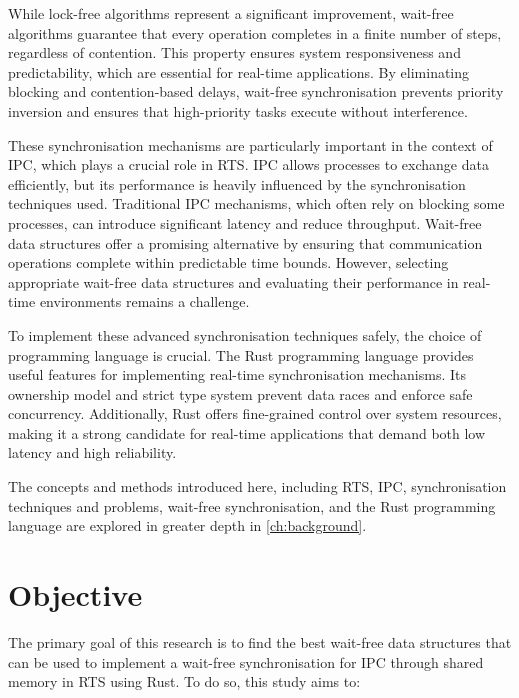 While lock-free algorithms represent a significant improvement, wait-free algorithms guarantee that every operation completes in a finite number of steps, regardless of contention. This property ensures system responsiveness and predictability, which are essential for real-time applications. By eliminating blocking and contention-based delays, wait-free synchronisation prevents priority inversion and ensures that high-priority tasks execute without interference. \cite{kogan2012methodology, herlihy1991wait, brandenburg2019multiprocessorrealtimelockingprotocols}

These synchronisation mechanisms are particularly important in the context of \ac{IPC}, which plays a crucial role in \ac{RTS}. \ac{IPC} allows processes to exchange data efficiently, but its performance is heavily influenced by the synchronisation techniques used. Traditional \ac{IPC} mechanisms, which often rely on blocking some processes, can introduce significant latency and reduce throughput. Wait-free data structures offer a promising alternative by ensuring that communication operations complete within predictable time bounds. However, selecting appropriate wait-free data structures and evaluating their performance in real-time environments remains a challenge. \cite{timnat2014practical, michael1996simple, huang2002improvingWaitFree, pellegrini2020relevancewaitfreecoordinationalgorithms}

To implement these advanced synchronisation techniques safely, the choice of programming language is crucial. The Rust programming language provides useful features for implementing real-time synchronisation mechanisms. Its ownership model and strict type system prevent data races and enforce safe concurrency. Additionally, Rust offers fine-grained control over system resources, making it a strong candidate for real-time applications that demand both low latency and high reliability. \cite{xu2023rust, sharma2024rustembeddedsystemscurrent}

The concepts and methods introduced here, including \ac{RTS}, \ac{IPC}, synchronisation techniques and problems, wait-free synchronisation, and the Rust programming language are explored in greater depth in \cref{ch:background}. 

\section{Objective}\label{sec:objective}

The primary goal of this research is to find the best wait-free data structures that can be used to implement a wait-free synchronisation for \ac{IPC} through shared memory in \ac{RTS} using Rust. To do so, this study aims to:

